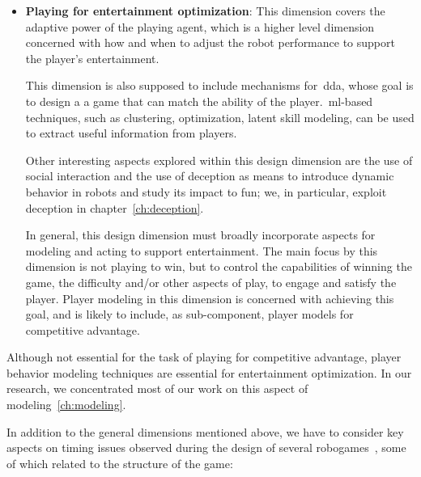 \begin{itemize}[leftmargin=*,labelsep=5.8mm]
\item \textbf{Playing for entertainment optimization}: This dimension covers the adaptive power of the playing agent, which is a higher level dimension concerned with how and when to adjust the robot performance to support the player's entertainment. 

This dimension is also supposed to include mechanisms for~\gls{dda}, whose goal is to design a a game that can match the ability of the player.~\gls{ml}-based techniques, such as clustering, optimization, latent skill modeling, can be used to extract useful information from players. 

Other interesting aspects explored within this design dimension are the use of social interaction and the use of deception as means to introduce dynamic behavior in robots and study its impact to fun; we, in particular, exploit deception in chapter~\ref{ch:deception}.

In general, this design dimension must broadly incorporate aspects for modeling and acting to support entertainment. The main focus by this dimension is not playing to win, but to control the capabilities of winning the game, \ie the difficulty and/or other aspects of play, to engage and satisfy the player. Player modeling in this dimension is concerned with achieving this goal, and is likely to include, as sub-component, player models for competitive advantage.
\end{itemize}


Although not essential for the task of playing for competitive advantage, player behavior modeling techniques are essential for entertainment optimization. In our research, we concentrated most of our work on this aspect of modeling~\ref{ch:modeling}.

In addition to the general dimensions mentioned above, we have to consider key aspects on timing issues observed during the design of several robogames~\cite{bonarini_timing_2014}, some of which related to the structure of the game:

